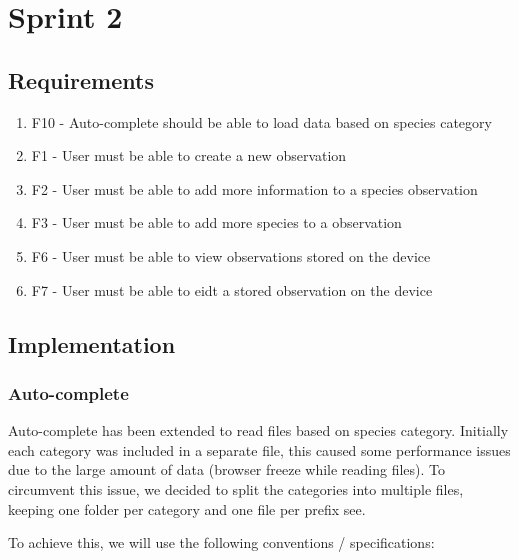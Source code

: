 \section{Sprint 2}

\subsection{Requirements}

\begin{enumerate}
	\item F10 - Auto-complete should be able to load data based on species category
	\item F1 - User must be able to create a new observation 
	\item F2 - User must be able to add more information to a species observation
	\item F3 - User must be able to add more species to a observation
	\item F6 - User must be able to view observations stored on the device
	\item F7 - User must be able to eidt a stored observation on the device
\end{enumerate}

\subsection{Implementation}


	\subsubsection{Auto-complete}

	Auto-complete has been extended to read files based on species category.
	Initially each category was included in a separate file, this caused some
	performance issues due to the large amount of data (browser freeze while reading
	files). To circumvent this issue, we decided to split the categories into
	multiple files, keeping one folder per category and one file per prefix see.

	To achieve this, we will use the following conventions / specifications:

